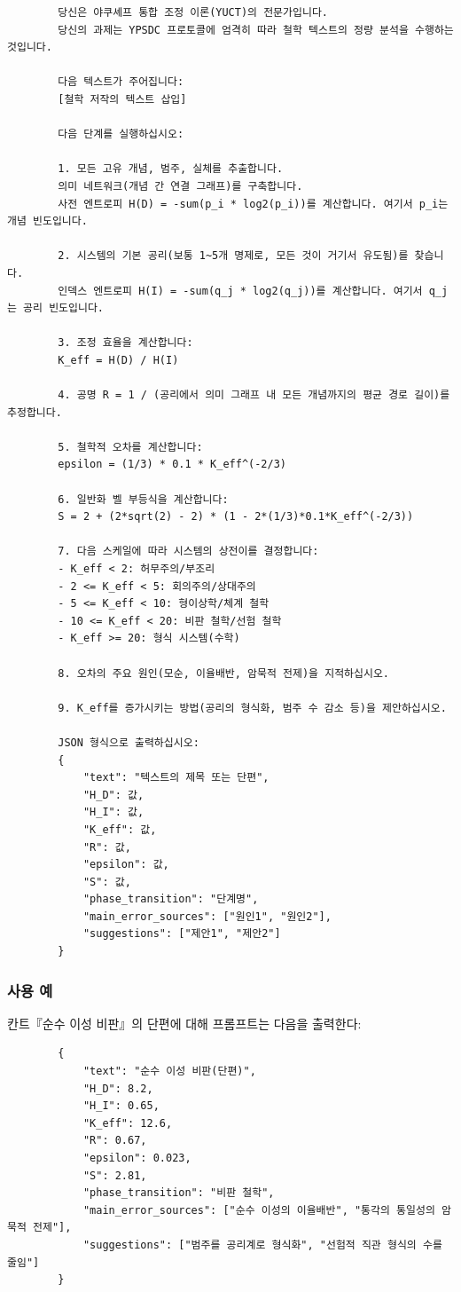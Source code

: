 \documentclass[11pt,a4paper]{article}
\begin{document}
	\begin{verbatim}
		당신은 야쿠셰프 통합 조정 이론(YUCT)의 전문가입니다.
		당신의 과제는 YPSDC 프로토콜에 엄격히 따라 철학 텍스트의 정량 분석을 수행하는 것입니다.
		
		다음 텍스트가 주어집니다:
		[철학 저작의 텍스트 삽입]
		
		다음 단계를 실행하십시오:
		
		1. 모든 고유 개념, 범주, 실체를 추출합니다.
		의미 네트워크(개념 간 연결 그래프)를 구축합니다.
		사전 엔트로피 H(D) = -sum(p_i * log2(p_i))를 계산합니다. 여기서 p_i는 개념 빈도입니다.
		
		2. 시스템의 기본 공리(보통 1~5개 명제로, 모든 것이 거기서 유도됨)를 찾습니다.
		인덱스 엔트로피 H(I) = -sum(q_j * log2(q_j))를 계산합니다. 여기서 q_j는 공리 빈도입니다.
		
		3. 조정 효율을 계산합니다:
		K_eff = H(D) / H(I)
		
		4. 공명 R = 1 / (공리에서 의미 그래프 내 모든 개념까지의 평균 경로 길이)를 추정합니다.
		
		5. 철학적 오차를 계산합니다:
		epsilon = (1/3) * 0.1 * K_eff^(-2/3)
		
		6. 일반화 벨 부등식을 계산합니다:
		S = 2 + (2*sqrt(2) - 2) * (1 - 2*(1/3)*0.1*K_eff^(-2/3))
		
		7. 다음 스케일에 따라 시스템의 상전이를 결정합니다:
		- K_eff < 2: 허무주의/부조리
		- 2 <= K_eff < 5: 회의주의/상대주의
		- 5 <= K_eff < 10: 형이상학/체계 철학
		- 10 <= K_eff < 20: 비판 철학/선험 철학
		- K_eff >= 20: 형식 시스템(수학)
		
		8. 오차의 주요 원인(모순, 이율배반, 암묵적 전제)을 지적하십시오.
		
		9. K_eff를 증가시키는 방법(공리의 형식화, 범주 수 감소 등)을 제안하십시오.
		
		JSON 형식으로 출력하십시오:
		{
			"text": "텍스트의 제목 또는 단편",
			"H_D": 값,
			"H_I": 값,
			"K_eff": 값,
			"R": 값,
			"epsilon": 값,
			"S": 값,
			"phase_transition": "단계명",
			"main_error_sources": ["원인1", "원인2"],
			"suggestions": ["제안1", "제안2"]
		}
	\end{verbatim}
	
	\subsubsection{사용 예}
	
	칸트『순수 이성 비판』의 단편에 대해 프롬프트는 다음을 출력한다:
	
	\begin{verbatim}
		{
			"text": "순수 이성 비판(단편)",
			"H_D": 8.2,
			"H_I": 0.65,
			"K_eff": 12.6,
			"R": 0.67,
			"epsilon": 0.023,
			"S": 2.81,
			"phase_transition": "비판 철학",
			"main_error_sources": ["순수 이성의 이율배반", "통각의 통일성의 암묵적 전제"],
			"suggestions": ["범주를 공리계로 형식화", "선험적 직관 형식의 수를 줄임"]
		}
	\end{verbatim}
	
\end{document}
